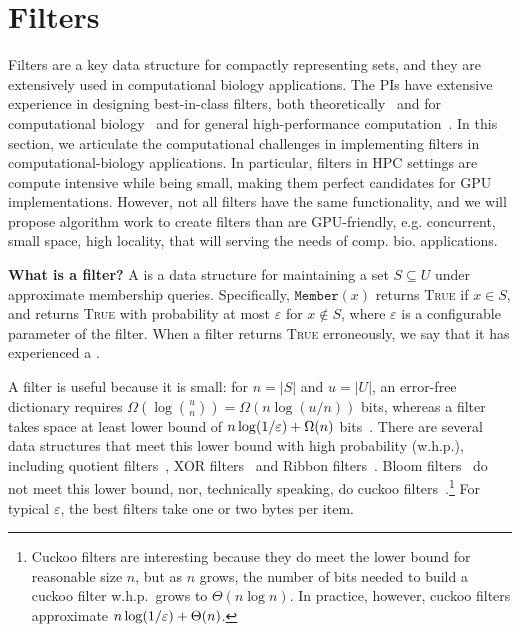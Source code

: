 
\section{Filters}

Filters are a key data structure for compactly representing sets, and they are extensively used in computational biology applications.  The PIs have extensive experience in designing best-in-class filters, both theoretically~\cite{BenderFaGo18,focs,BenderDaFa21,stoc} and for computational biology~\cite{prashant,rob} and for general high-performance computation~\cite{DBLP:conf/usenix/ConwayGCFSTJ20,sigmod,other-sigmod, vldb}.
In this section, we articulate the computational challenges in implementing filters in computational-biology applications. 
In particular, filters in HPC settings are compute intensive while being small, making them perfect candidates for GPU implementations.  
However, not all filters have the same functionality, and we will propose algorithm work to create filters than are GPU-friendly, e.g. concurrent, small space, high locality, that will serving the needs of comp. bio. applications.



\noindent\textbf{What is a filter?} A  is a data structure for maintaining a set $S\subseteq U$ under approximate membership queries. Specifically, $\texttt{Member}(x)$ returns \textsc{True} if $x\in S$, and returns \textsc{True} with probability at most $\varepsilon$ for $x\notin S$, where $\varepsilon$ is a configurable parameter of the filter.  When a filter returns \textsc{True} erroneously, we say that it has experienced a .

A filter is useful because it is small: for $n= |S|$ and $u = |U|$, an error-free dictionary requires $\Omega(\log {u\choose n}) = \Omega(n \log (u/n))$ bits, whereas a filter  takes space at least  lower bound of $n\log (1/\varepsilon) + \Omega(n)$ bits~\cite{CarterFG78}.  There are several data structures that meet this lower bound with high probability (w.h.p.), including quotient filters~\cite{Cleary84,PaghPaRa05,DillingerM09,BenderFaJo12,PandeyBJP17,PandeyCDBFJ21}, XOR filters~\cite{GrafLe20} and Ribbon filters~\cite{DillingerW21}.  Bloom filters~\cite{Bloom70} do not meet this lower bound, nor, technically speaking, do cuckoo filters~\cite{FanAnKa14,BreslowJ18}.\footnote{Cuckoo filters are interesting because they do meet the lower bound for reasonable size $n$, but as $n$ grows, the number of bits needed to build a cuckoo filter w.h.p.\ grows to $\Theta(n\log n)$.  In practice, however, cuckoo filters approximate $n\log (1/\varepsilon) + \Theta(n)$.}
%
For typical $\varepsilon$, the best filters take one or two bytes per item.

